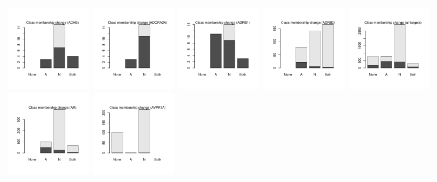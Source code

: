 \documentclass[10pt,article]{memoir}
\begin{document}
\begin{figure}[h!]
\includegraphics[width=0.19\textwidth]{figures/validation_plots/ache_0p9_valplot.pdf}
\includegraphics[width=0.19\textwidth]{figures/validation_plots/adora2a_0p9_valplot.pdf}
\includegraphics[width=0.19\textwidth]{figures/validation_plots/adrb1_0p9_valplot.pdf}
\includegraphics[width=0.19\textwidth]{figures/validation_plots/adrb2_0p9_valplot.pdf}
\includegraphics[width=0.19\textwidth]{figures/validation_plots/alltargets_0p9_valplot.pdf}
\includegraphics[width=0.19\textwidth]{figures/validation_plots/ar_0p9_valplot.pdf}
\includegraphics[width=0.19\textwidth]{figures/validation_plots/avpr1a_0p9_valplot.pdf}

\end{figure}
\end{document}
